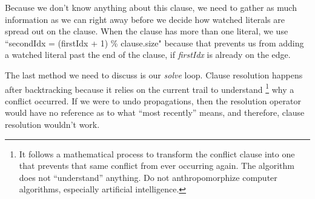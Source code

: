 \documentclass[oneside]{book}
\begin{document}
Because we don't know anything about this clause, we need to gather as much 
information as we can right away before we decide how watched literals are 
spread out on the clause. When the clause has more than one literal, we 
use ``secondIdx = (firstIdx + 1) \% clause.size" because that prevents us 
from adding a watched literal past the end of the clause, if \textit{firstIdx}
is already on the edge.

The last method we need to discuss is our \textit{solve} loop. Clause 
resolution happens after backtracking because it relies on the current 
trail to understand
\footnote{It follows a mathematical process to transform the conflict clause 
into one that prevents that same conflict from ever occurring again. The 
algorithm does not ``understand'' anything. Do not anthropomorphize computer 
algorithms, especially artificial intelligence.}
why a conflict occurred. If we were to undo propagations, then the resolution 
operator would have no reference as to what ``most recently'' means, and 
therefore, clause resolution wouldn't work.
\end{document}
